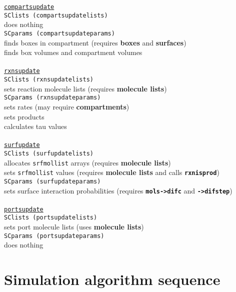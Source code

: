 \documentclass {book}
\newcommand {\ttt} {\texttt}
\begin{document}
\begin{tabbing}
\>\ttt{\underline{compartsupdate}}\\
\>\>\ttt{SClists (compartsupdatelists)}\\
\>\>\>does nothing\\
\>\>\ttt{SCparams (compartsupdateparams)}\\
\>\>\>finds boxes in compartment (requires \textbf{boxes} and \textbf{surfaces})\\
\>\>\>finds box volumes and compartment volumes\\
\>\\
\>\ttt{\underline{rxnsupdate}}\\
\>\>\ttt{SClists (rxnsupdatelists)}\\
\>\>\>sets reaction molecule lists (requires \textbf{molecule lists})\\
\>\>\ttt{SCparams (rxnsupdateparams)}\\
\>\>\>sets rates (may require \textbf{compartments})\\
\>\>\>sets products\\
\>\>\>calculates tau values\\
\>\\
\>\ttt{\underline{surfupdate}}\\
\>\>\ttt{SClists (surfupdatelists)}\\
\>\>\>allocates \ttt{srfmollist} arrays (requires \textbf{molecule lists})\\
\>\>\>sets \ttt{srfmollist} values (requires \textbf{molecule lists} and calls \ttt{\textbf{rxnisprod}})\\
\>\>\ttt{SCparams (surfupdateparams)}\\
\>\>\>sets surface interaction probabilities (requires \ttt{\textbf{mols->difc}} and \ttt{\textbf{->difstep}})\\
\>\\
\>\ttt{\underline{portsupdate}}\\
\>\>\ttt{SClists (portsupdatelists)}\\
\>\>\>sets port molecule lists (uses \textbf{molecule lists})\\
\>\>\ttt{SCparams (portsupdateparams)}\\
\>\>\>does nothing\\
\end{tabbing}

\section{Simulation algorithm sequence}
\end{document}
